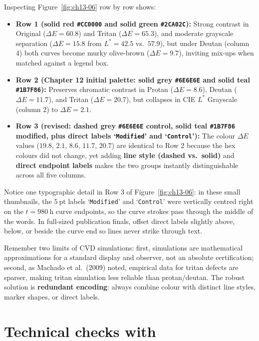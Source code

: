 Inspecting Figure~\ref{fig:ch13-06} row by row shows:
\begin{itemize}
\item \textbf{Row 1 (solid red \texttt{\#CC0000} and solid green \texttt{\#2CA02C}):} Strong contrast in Original ($\Delta E = 60.8$) and Tritan ($\Delta E = 65.3$), and moderate grayscale separation ($\Delta E = 15.8$ from $L^* = 42.5$ vs.\ $57.9$), but under Deutan (column 4) both curves become murky olive-brown ($\Delta E = 9.7$), inviting mix-ups when matched against a legend box.
\item \textbf{Row 2 (Chapter 12 initial palette: solid grey \texttt{\#6E6E6E} and solid teal \texttt{\#1B7F86}):} Preserves chromatic contrast in Protan ($\Delta E = 8.6$), Deutan ($\Delta E = 11.7$), and Tritan ($\Delta E = 20.7$), but collapses in CIE $L^*$ Grayscale (column 2) to \textbf{$\Delta E = 2.1$}.
\item \textbf{Row 3 (revised: dashed grey \texttt{\#6E6E6E} control, solid teal \texttt{\#1B7F86} modified, plus direct labels `\texttt{Modified}' and `\texttt{Control}'):} The colour $\Delta E$ values ($19.8$, $2.1$, $8.6$, $11.7$, $20.7$) are identical to Row 2 because the hex colours did not change, yet adding \textbf{line style (dashed vs.\ solid)} and \textbf{direct endpoint labels} makes the two groups instantly distinguishable across all five columns.
\end{itemize}

Notice one typographic detail in Row 3 of Figure~\ref{fig:ch13-06}: in these small thumbnails, the $5\ \text{pt}$ labels `\texttt{Modified}' and `\texttt{Control}' were vertically centred right on the $t = 980\ \text{h}$ curve endpoints, so the curve strokes pass through the middle of the words. In full-sized publication finals, offset direct labels slightly above, below, or beside the curve end so lines never strike through text.

Remember two limits of CVD simulations: first, simulations are mathematical approximations for a standard display and observer, not an absolute certification; second, as Machado et al.\ (2009) noted, empirical data for tritan defects are sparser, making tritan simulation less reliable than protan/deutan. The robust solution is \textbf{redundant encoding}: always combine colour with distinct line styles, marker shapes, or direct labels.

\section{Technical checks with }

